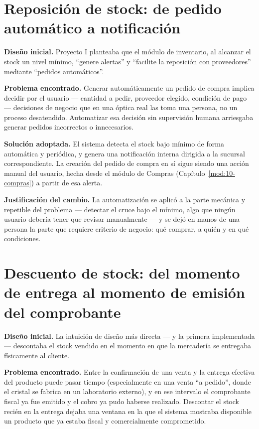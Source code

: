 \section{Reposición de stock: de pedido automático a notificación}
\label{sec:cambios-reposicion}

\textbf{Diseño inicial.} Proyecto I planteaba que el módulo de inventario, al alcanzar el stock un nivel mínimo, ``genere alertas'' y ``facilite la reposición con proveedores'' mediante ``pedidos automáticos''.

\textbf{Problema encontrado.} Generar automáticamente un pedido de compra implica decidir por el usuario --- cantidad a pedir, proveedor elegido, condición de pago --- decisiones de negocio que en una óptica real las toma una persona, no un proceso desatendido. Automatizar esa decisión sin supervisión humana arriesgaba generar pedidos incorrectos o innecesarios.

\textbf{Solución adoptada.} El sistema detecta el stock bajo mínimo de forma automática y periódica, y genera una notificación interna dirigida a la sucursal correspondiente. La creación del pedido de compra en sí sigue siendo una acción manual del usuario, hecha desde el módulo de Compras (Capítulo~\ref{mod:10-compras}) a partir de esa alerta.

\textbf{Justificación del cambio.} La automatización se aplicó a la parte mecánica y repetible del problema --- detectar el cruce bajo el mínimo, algo que ningún usuario debería tener que revisar manualmente --- y se dejó en manos de una persona la parte que requiere criterio de negocio: qué comprar, a quién y en qué condiciones.

\section{Descuento de stock: del momento de entrega al momento de emisión del comprobante}
\label{sec:cambios-stock-emision}

\textbf{Diseño inicial.} La intuición de diseño más directa --- y la primera implementada --- descontaba el stock vendido en el momento en que la mercadería se entregaba físicamente al cliente.

\textbf{Problema encontrado.} Entre la confirmación de una venta y la entrega efectiva del producto puede pasar tiempo (especialmente en una venta ``a pedido'', donde el cristal se fabrica en un laboratorio externo), y en ese intervalo el comprobante fiscal ya fue emitido y el cobro ya pudo haberse realizado. Descontar el stock recién en la entrega dejaba una ventana en la que el sistema mostraba disponible un producto que ya estaba fiscal y comercialmente comprometido.


